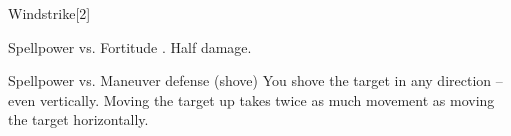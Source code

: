 \begin{spellsection}{Windstrike}[2]
    \begin{spellheader}
    \end{spellheader}
    \begin{spellcontent}
        \begin{spelltargetinginfo}
        \end{spelltargetinginfo}
        \begin{spelleffects}
            \begin{spellattack}{Spellpower vs. Fortitude}
                \spellsuccess {}.
                \spellfailure Half damage.
            \end{spellattack}
            \begin{spellattack}{Spellpower vs. Maneuver defense (shove)}
                \spellsuccess You shove the target in any direction -- even vertically. Moving the target up takes twice as much movement as moving the target horizontally.
            \end{spellattack}
        \end{spelleffects}
    \end{spellcontent}
    \begin{spellfooter}
        \miscastrandom
    \end{spellfooter}
\end{spellsection}

